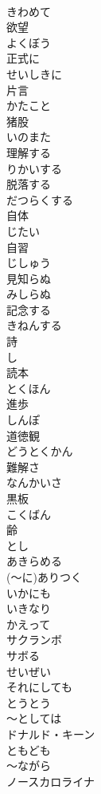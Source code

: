 \documentclass[8pt]{extreport}
\begin{document}
\begin{CJK}{UTF8}{min}
\\	きわめて
\\	欲望	
\\	よくぼう
\\	正式に	
\\	せいしきに
\\	片言	
\\	かたこと
\\	猪股	
\\	いのまた
\\	理解する	
\\	りかいする
\\	脱落する	
\\	だつらくする
\\	自体	
\\	じたい
\\	自習	
\\	じしゅう
\\	見知らぬ	
\\	みしらぬ
\\	記念する	
\\	きねんする
\\	詩	
\\	し
\\	読本	
\\	とくほん
\\	進歩	
\\	しんぽ
\\	道徳観	
\\	どうとくかん
\\	難解さ	
\\	なんかいさ
\\	黒板	
\\	こくばん
\\	齢	
\\	とし
\\	あきらめる	
\\	(～に)ありつく	
\\	いかにも	
\\	いきなり	
\\	かえって	
\\	サクランボ	
\\	サボる	
\\	せいぜい	
\\	それにしても	
\\	とうとう	
\\	～としては	
\\	ドナルド・キーン	
\\	ともども	
\\	～ながら	
\\	ノースカロライナ	

\end{CJK}
\end{document}
